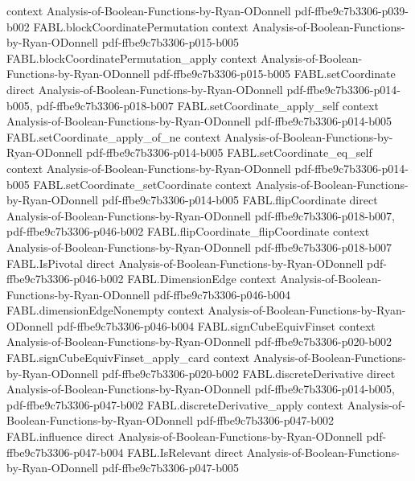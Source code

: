 \begin{theorem}
  {context}
  {Analysis-of-Boolean-Functions-by-Ryan-ODonnell}
  {pdf-ffbe9c7b3306-p039-b002}
\proofstep
  {FABL.blockCoordinatePermutation}
  {context}
  {Analysis-of-Boolean-Functions-by-Ryan-ODonnell}
  {pdf-ffbe9c7b3306-p015-b005}
\proofstep
  {FABL.blockCoordinatePermutation_apply}
  {context}
  {Analysis-of-Boolean-Functions-by-Ryan-ODonnell}
  {pdf-ffbe9c7b3306-p015-b005}
\proofstep
  {FABL.setCoordinate}
  {direct}
  {Analysis-of-Boolean-Functions-by-Ryan-ODonnell}
  {pdf-ffbe9c7b3306-p014-b005,
    pdf-ffbe9c7b3306-p018-b007}
\proofstep
  {FABL.setCoordinate_apply_self}
  {context}
  {Analysis-of-Boolean-Functions-by-Ryan-ODonnell}
  {pdf-ffbe9c7b3306-p014-b005}
\proofstep
  {FABL.setCoordinate_apply_of_ne}
  {context}
  {Analysis-of-Boolean-Functions-by-Ryan-ODonnell}
  {pdf-ffbe9c7b3306-p014-b005}
\proofstep
  {FABL.setCoordinate_eq_self}
  {context}
  {Analysis-of-Boolean-Functions-by-Ryan-ODonnell}
  {pdf-ffbe9c7b3306-p014-b005}
\proofstep
  {FABL.setCoordinate_setCoordinate}
  {context}
  {Analysis-of-Boolean-Functions-by-Ryan-ODonnell}
  {pdf-ffbe9c7b3306-p014-b005}
\proofstep
  {FABL.flipCoordinate}
  {direct}
  {Analysis-of-Boolean-Functions-by-Ryan-ODonnell}
  {pdf-ffbe9c7b3306-p018-b007,
    pdf-ffbe9c7b3306-p046-b002}
\proofstep
  {FABL.flipCoordinate_flipCoordinate}
  {context}
  {Analysis-of-Boolean-Functions-by-Ryan-ODonnell}
  {pdf-ffbe9c7b3306-p018-b007}
\proofstep
  {FABL.IsPivotal}
  {direct}
  {Analysis-of-Boolean-Functions-by-Ryan-ODonnell}
  {pdf-ffbe9c7b3306-p046-b002}
\proofstep
  {FABL.DimensionEdge}
  {context}
  {Analysis-of-Boolean-Functions-by-Ryan-ODonnell}
  {pdf-ffbe9c7b3306-p046-b004}
\proofstep
  {FABL.dimensionEdgeNonempty}
  {context}
  {Analysis-of-Boolean-Functions-by-Ryan-ODonnell}
  {pdf-ffbe9c7b3306-p046-b004}
\proofstep
  {FABL.signCubeEquivFinset}
  {context}
  {Analysis-of-Boolean-Functions-by-Ryan-ODonnell}
  {pdf-ffbe9c7b3306-p020-b002}
\proofstep
  {FABL.signCubeEquivFinset_apply_card}
  {context}
  {Analysis-of-Boolean-Functions-by-Ryan-ODonnell}
  {pdf-ffbe9c7b3306-p020-b002}
\proofstep
  {FABL.discreteDerivative}
  {direct}
  {Analysis-of-Boolean-Functions-by-Ryan-ODonnell}
  {pdf-ffbe9c7b3306-p014-b005,
    pdf-ffbe9c7b3306-p047-b002}
\proofstep
  {FABL.discreteDerivative_apply}
  {context}
  {Analysis-of-Boolean-Functions-by-Ryan-ODonnell}
  {pdf-ffbe9c7b3306-p047-b002}
\proofstep
  {FABL.influence}
  {direct}
  {Analysis-of-Boolean-Functions-by-Ryan-ODonnell}
  {pdf-ffbe9c7b3306-p047-b004}
\proofstep
  {FABL.IsRelevant}
  {direct}
  {Analysis-of-Boolean-Functions-by-Ryan-ODonnell}
  {pdf-ffbe9c7b3306-p047-b005}

\end{theorem}
